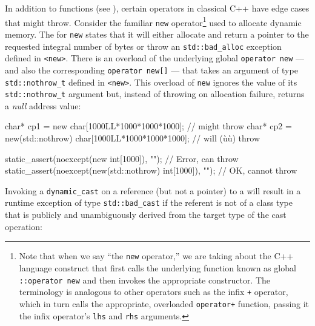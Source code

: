 In addition to functions (see ), certain operators in classical C++ have
edge cases that might throw. Consider the familiar \lstinline!new!
operator{\cprotect\footnote{Note that when we say ``the \lstinline!new!
operator,'' we are taking about the C++ language construct that first
calls the underlying function known as global
\lstinline!::operator!~\lstinline!new! and then invokes the appropriate
constructor. The terminology is analogous to other operators such as
the infix \lstinline!+! operator, which in turn calls the appropriate,
overloaded \lstinline!operator+! function, passing it the infix
  operator's \lstinline!lhs! and \lstinline!rhs! arguments.}} used to allocate
dynamic memory. The  for \lstinline!new! states that it
will either allocate and return a pointer to the requested integral
number of bytes or throw an \lstinline!std::bad_alloc! exception defined
in \lstinline!<new>!. There is an overload of the underlying global
\lstinline!operator!~\lstinline!new! --- and also the corresponding
\lstinline!operator!~\lstinline!new[]! --- that takes an argument of type
\lstinline!std::nothrow_t! defined in \lstinline!<new>!. This overload of
\lstinline!new! ignores the value of its \lstinline!std::nothrow_t! argument
but, instead of throwing on allocation failure, returns a \emph{null}
address value:

\begin{emcppslisting}
char* cp1 = new               char[1000LL*1000*1000*1000];  // might throw
char* cp2 = new(std::nothrow) char[1000LL*1000*1000*1000];  // will (ù{}ù) throw

static_assert(noexcept(new               int[1000]), "");   // Error, can throw
static_assert(noexcept(new(std::nothrow) int[1000]), "");   // OK, cannot throw
\end{emcppslisting}
    

\noindent Invoking a \lstinline!dynamic_cast! on a reference (but not a pointer) to
a  will result in a runtime exception of type
\lstinline!std::bad_cast! if the referent is not of a class type that is
publicly and unambiguously derived from the target type of the cast
operation:

